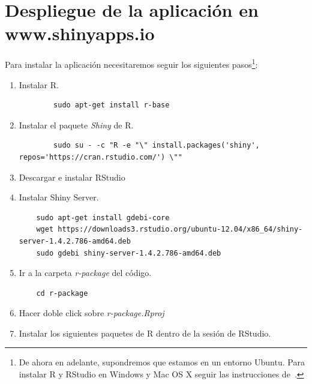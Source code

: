 \chapter[Despliegue de la aplicación]{Despliegue de la aplicación en www.shinyapps.io}

Para instalar la aplicación necesitaremos seguir los siguientes pasos\footnote{De ahora en adelante, supondremos que estamos en un entorno Ubuntu. Para instalar R y RStudio en Windows y Mac OS X seguir las instrucciones de~\cite{instalacionWindowsMac}.}:

\begin{enumerate}
	\item Instalar R.
	
	\begin{verbatim}
		sudo apt-get install r-base
	\end{verbatim}
	
	\item Instalar el paquete \textit{Shiny} de R.
	
	\begin{verbatim}
		sudo su - -c "R -e "\" install.packages('shiny', repos='https://cran.rstudio.com/') \""
	\end{verbatim}
	
	\item Descargar e instalar RStudio~\cite{RStudio}
	
	\item Instalar Shiny Server.
	
	\begin{verbatim}
	sudo apt-get install gdebi-core
	wget https://downloads3.rstudio.org/ubuntu-12.04/x86_64/shiny-server-1.4.2.786-amd64.deb
	sudo gdebi shiny-server-1.4.2.786-amd64.deb
	\end{verbatim}
	
	\item Ir a la carpeta \textit{r-package} del código. 
	
	\begin{verbatim}
	cd r-package
	\end{verbatim}
	
	\item Hacer doble click sobre \textit{r-package.Rproj}
	
	\item Instalar los siguientes paquetes de R dentro de la sesión de RStudio.
	

\end{enumerate}
